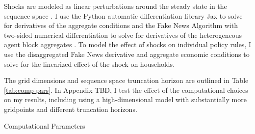 Shocks are modeled as linear perturbations around the steady state in the sequence space \autocite{auclert2021using}. I use the Python automatic differentiation library Jax to solve for derivatives of the aggregate conditions and the Fake News Algorithm with two-sided numerical differentiation to solve for derivatives of the heterogeneous agent block aggregates \autocites{auclert2021using}. To model the effect of shocks on individual policy rules, I use the disaggregated Fake News derivative and aggregate economic conditions to solve for the linearized effect of the shock on households.

The grid dimensions and sequence space truncation horizon are outlined in Table \ref{tab:comp-pars}. In Appendix TBD, I test the effect of the computational choices on my results, including using a high-dimensional model with substantially more gridpoints and different truncation horizons.

\begin{table}[t]
    \centering
    \caption{Computational Parameters}
    
    \label{tab:comp-pars}
\end{table}
